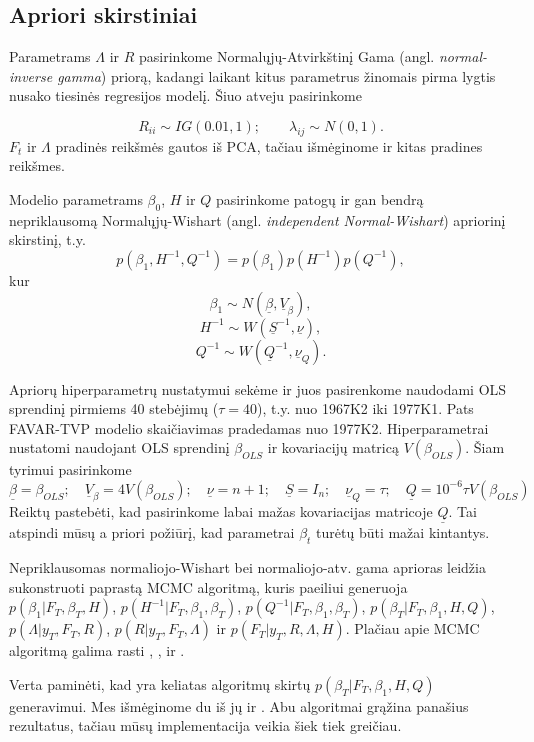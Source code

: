 \documentclass[12pt,lithuanian,]{article}
\begin{document}
\subsection{Apriori skirstiniai}\label{apriori-skirstiniai}

Parametrams \(\Lambda\) ir \(R\) pasirinkome Normalųjų-Atvirkštinį Gama
(angl. \emph{normal-inverse gamma}) priorą, kadangi laikant kitus
parametrus žinomais pirma lygtis nusako tiesinės regresijos modelį. Šiuo
atveju pasirinkome

\[R_{ii} \sim IG(0.01, 1); \qquad \lambda_{ij} \sim N(0, 1).\] \(F_t\)
ir \(\Lambda\) pradinės reikšmės gautos iš PCA, tačiau išmėginome ir
kitas pradines reikšmes.

Modelio parametrams \(\beta_0\), \(H\) ir \(Q\) pasirinkome patogų ir
gan bendrą nepriklausomą Normalųjų-Wishart (angl. \emph{independent
Normal-Wishart}) apriorinį skirstinį, t.y.
\[ p(\beta_1, H^{-1}, Q^{-1}) = p(\beta_1) p(H^{-1}) p(Q^{-1}), \] kur
\[\beta_1 \sim N(\underline{\beta}, \underline{V}_{\beta}) ,\]
\[H^{-1} \sim W(\underline{S}^{-1}, \underline{\nu}), \]
\[Q^{-1} \sim W(\underline{Q}^{-1}, \underline{\nu}_Q). \]

Apriorų hiperparametrų nustatymui sekėme \citet{Primiceri2005} ir juos
pasirenkome naudodami OLS sprendinį pirmiems 40 stebėjimų
(\(\tau = 40\)), t.y. nuo 1967K2 iki 1977K1. Pats FAVAR-TVP modelio
skaičiavimas pradedamas nuo 1977K2. Hiperparametrai nustatomi naudojant
OLS sprendinį \(\beta_{OLS}\) ir kovariacijų matricą \(V(\beta_{OLS})\).
Šiam tyrimui pasirinkome
\[\underline{\beta} = \beta_{OLS}; \quad \underline{V}_{\beta} = 4V(\beta_{OLS}); \quad  \underline{\nu} = n +1; \quad \underline{S} = I_n; \quad \underline{\nu}_Q = \tau; \quad \underline{Q} = 10^{-6} \tau V(\beta_{OLS})\]
Reiktų pastebėti, kad pasirinkome labai mažas kovariacijas matricoje
\(\underline{Q}\). Tai atspindi mūsų a priori požiūrį, kad parametrai
\(\beta_t\) turėtų būti mažai kintantys.

Nepriklausomas normaliojo-Wishart bei normaliojo-atv. gama aprioras
leidžia sukonstruoti paprastą MCMC algoritmą, kuris paeiliui generuoja
\(p(\beta_1 | F_T, \beta_T, H)\), \(p(H^{-1}| F_T, \beta_1, \beta_T)\),
\(p(Q^{-1}|F_T, \beta_1, \beta_T )\),
\(p(\beta_T |F_T, \beta_1, H, Q)\), \(p(\Lambda | y_T, F_T, R)\),
\(p(R| y_T, F_T, \Lambda)\) ir \(p(F_T|y_T, R, \Lambda, H)\). Plačiau
apie MCMC algoritmą galima rasti \citet{KoopKorobilis2010},
\citet{blake2012applied}, \citet{Bernanke2004} ir
\citet{EllisMumtaz2014}.

Verta paminėti, kad yra keliatas algoritmų skirtų
\(p(\beta_T | F_T, \beta_1, H, Q)\) generavimui. Mes išmėginome du iš jų
\citet{CC1994} ir \citet{DK2002}. Abu algoritmai grąžina panašius
rezultatus, tačiau mūsų \citet{DK2002} implementacija veikia šiek tiek
greičiau.
\end{document}
